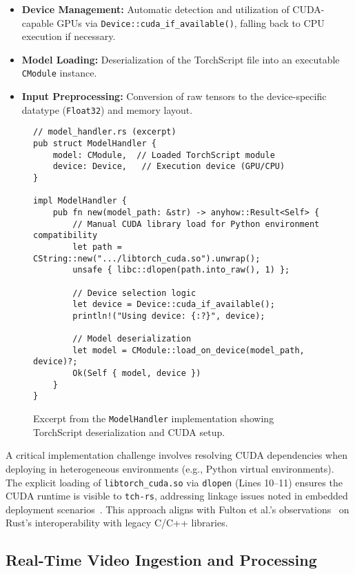 \begin{itemize}
  \item \textbf{Device Management:} Automatic detection and utilization of CUDA-capable GPUs via \texttt{Device::cuda\_if\_available()}, falling back to CPU execution if necessary.
  \item \textbf{Model Loading:} Deserialization of the TorchScript file into an executable \texttt{CModule} instance.
  \item \textbf{Input Preprocessing:} Conversion of raw tensors to the device-specific datatype (\texttt{Float32}) and memory layout.
\end{itemize}

\begin{figure}[htbp]
\centering
\begin{verbatim}
// model_handler.rs (excerpt)
pub struct ModelHandler {
    model: CModule,  // Loaded TorchScript module
    device: Device,   // Execution device (GPU/CPU)
}

impl ModelHandler {
    pub fn new(model_path: &str) -> anyhow::Result<Self> {
        // Manual CUDA library load for Python environment compatibility
        let path = CString::new(".../libtorch_cuda.so").unwrap();
        unsafe { libc::dlopen(path.into_raw(), 1) };

        // Device selection logic
        let device = Device::cuda_if_available();
        println!("Using device: {:?}", device);

        // Model deserialization
        let model = CModule::load_on_device(model_path, device)?;
        Ok(Self { model, device })
    }
}
\end{verbatim}
\caption{Excerpt from the \texttt{ModelHandler} implementation showing TorchScript deserialization and CUDA setup.}
\label{lst:model_handler}
\end{figure}

A critical implementation challenge involves resolving CUDA dependencies when deploying in heterogeneous environments (e.g., Python virtual environments). The explicit loading of \texttt{libtorch\_cuda.so} via \texttt{dlopen} (Lines 10--11) ensures the CUDA runtime is visible to \texttt{tch-rs}, addressing linkage issues noted in embedded deployment scenarios~\cite{carnelos2025microflow, sharma2023rust}. This approach aligns with Fulton et al.’s observations~\cite{fulton2022benefits} on Rust’s interoperability with legacy C/C++ libraries.

\subsection{Real-Time Video Ingestion and Processing}
\label{subsec:realtime_ingestion}

